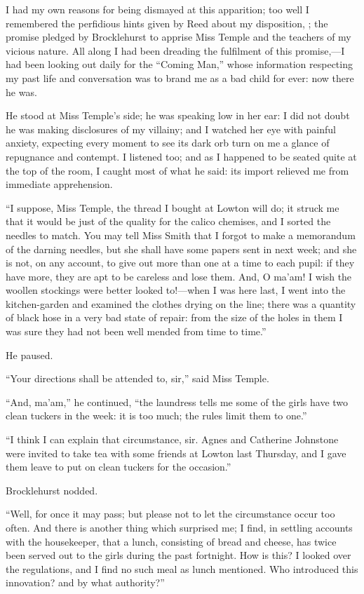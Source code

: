 I had my own reasons for being dismayed at this apparition; too well I
remembered the perfidious hints given by \Mrs{} Reed about my disposition,
\etc; the promise pledged by \Mr{} Brocklehurst to apprise Miss Temple and
the teachers of my vicious nature. All along I had been dreading the
fulfilment of this promise,---I had been looking out daily for the
\enquote{Coming Man,} whose information respecting my past life and
conversation was to brand me as a bad child for ever: now there he was.

He stood at Miss Temple's side; he was speaking low in her ear: I did
not doubt he was making disclosures of my villainy; and I watched her
eye with painful anxiety, expecting every moment to see its dark orb
turn on me a glance of repugnance and contempt. I listened too; and as
I happened to be seated quite at the top of the room, I caught most of
what he said: its import relieved me from immediate apprehension.

\enquote{I suppose, Miss Temple, the thread I bought at Lowton will do;
it struck me that it would be just of the quality for the calico
chemises, and I sorted the needles to match. You may tell Miss Smith
that I forgot to make a memorandum of the darning needles, but she shall
have some papers sent in next week; and she is not, on any account, to
give out more than one at a time to each pupil: if they have more, they
are apt to be careless and lose them. And, O ma'am! I wish the woollen
stockings were better looked to!---when I was here last, I went into the
kitchen-garden and examined the clothes drying on the line; there was a
quantity of black hose in a very bad state of repair: from the size of
the holes in them I was sure they had not been well mended from time to
time.}

He paused.

\enquote{Your directions shall be attended to, sir,} said Miss Temple.

\enquote{And, ma'am,} he continued, \enquote{the laundress tells me some
of the girls have two clean tuckers in the week: it is too much; the
rules limit them to one.}

\enquote{I think I can explain that circumstance, sir. Agnes and
Catherine Johnstone were invited to take tea with some friends at Lowton
last Thursday, and I gave them leave to put on clean tuckers for the
occasion.}

\Mr{} Brocklehurst nodded.

\enquote{Well, for once it may pass; but please not to let the
circumstance occur too often. And there is another thing which
surprised me; I find, in settling accounts with the housekeeper, that a
lunch, consisting of bread and cheese, has twice been served out to the
girls during the past fortnight. How is this? I looked over the
regulations, and I find no such meal as lunch mentioned. Who introduced
this innovation? and by what authority?}

